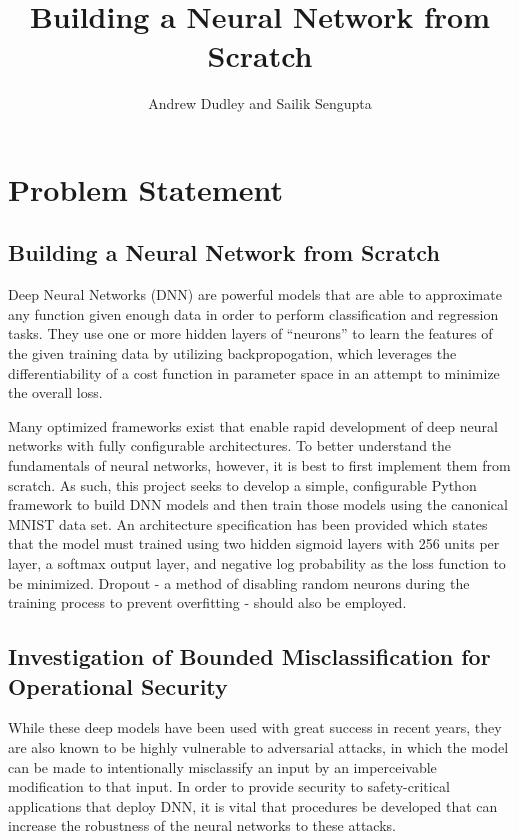 \documentclass[12pt]{article}
\title{Building a Neural Network from Scratch\vspace{-1em}}
\author{Andrew Dudley and Sailik Sengupta\vspace{-1em}}
\begin{document}
\maketitle
 \vspace{-3em}
    \section{Problem Statement}
    \subsection{Building a Neural Network from Scratch}
        Deep Neural Networks (DNN) are powerful models that are able to approximate any function given enough data in order to perform classification and regression tasks. They use one or more hidden layers of ``neurons'' to learn the features of the given training data by utilizing backpropogation, which leverages the differentiability of a cost function in parameter space in an attempt to minimize the overall loss.

        Many optimized frameworks exist that enable rapid development of deep neural networks with fully configurable architectures. To better understand the fundamentals of neural networks, however, it is best to first implement them from scratch. As such, this project seeks to develop a simple, configurable Python framework to build DNN models and then train those models using the canonical MNIST data set. An architecture specification has been provided which states that the model must trained using two hidden sigmoid layers with 256 units per layer, a softmax output layer, and negative log probability as the loss function to be minimized. Dropout - a method of disabling random neurons during the training process to prevent overfitting - should also be employed.

        \subsection{Investigation of Bounded Misclassification for \\Operational Security}
        While these deep models have been used with great success in recent years, they are also known to be highly vulnerable to adversarial attacks, in which the model can be made to intentionally misclassify an input by an imperceivable modification to that input. In order to provide security to safety-critical applications that deploy DNN, it is vital that procedures be developed that can increase the robustness of the neural networks to these attacks.
\end{document}
